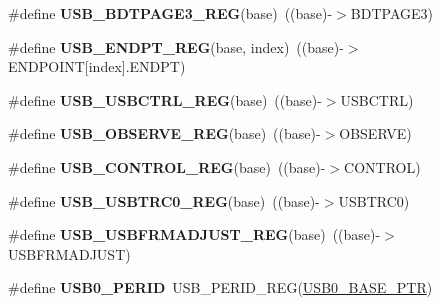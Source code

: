 \begin{DoxyCompactItemize}
\#define {\bfseries U\+S\+B\+\_\+\+B\+D\+T\+P\+A\+G\+E3\+\_\+\+R\+EG}(base)~((base)-\/$>$B\+D\+T\+P\+A\+G\+E3)
\item 
\mbox{\label{group___u_s_b___register___accessor___macros_ga93e8b132ffc209ad3ba99ba2cbf4f990}} 
\#define {\bfseries U\+S\+B\+\_\+\+E\+N\+D\+P\+T\+\_\+\+R\+EG}(base,  index)~((base)-\/$>$E\+N\+D\+P\+O\+I\+NT\mbox{[}index\mbox{]}.E\+N\+D\+PT)
\item 
\mbox{\label{group___u_s_b___register___accessor___macros_ga7e767cbc19006f290fd3acb0bda4b0d7}} 
\#define {\bfseries U\+S\+B\+\_\+\+U\+S\+B\+C\+T\+R\+L\+\_\+\+R\+EG}(base)~((base)-\/$>$U\+S\+B\+C\+T\+RL)
\item 
\mbox{\label{group___u_s_b___register___accessor___macros_gacf3b928d262722e221b19407d6fd1d4b}} 
\#define {\bfseries U\+S\+B\+\_\+\+O\+B\+S\+E\+R\+V\+E\+\_\+\+R\+EG}(base)~((base)-\/$>$O\+B\+S\+E\+R\+VE)
\item 
\mbox{\label{group___u_s_b___register___accessor___macros_gae70ee8839acefd0aeb3e0c5129b59c76}} 
\#define {\bfseries U\+S\+B\+\_\+\+C\+O\+N\+T\+R\+O\+L\+\_\+\+R\+EG}(base)~((base)-\/$>$C\+O\+N\+T\+R\+OL)
\item 
\mbox{\label{group___u_s_b___register___accessor___macros_gaff7c1525f5741bfe869a137149371c89}} 
\#define {\bfseries U\+S\+B\+\_\+\+U\+S\+B\+T\+R\+C0\+\_\+\+R\+EG}(base)~((base)-\/$>$U\+S\+B\+T\+R\+C0)
\item 
\mbox{\label{group___u_s_b___register___accessor___macros_ga0c14a322173f3a4dbb3cc4ea025724ae}} 
\#define {\bfseries U\+S\+B\+\_\+\+U\+S\+B\+F\+R\+M\+A\+D\+J\+U\+S\+T\+\_\+\+R\+EG}(base)~((base)-\/$>$U\+S\+B\+F\+R\+M\+A\+D\+J\+U\+ST)
\item 
\mbox{\label{group___u_s_b___register___accessor___macros_gabee4af6581d4520bd5d8d823d8668889}} 
\#define {\bfseries U\+S\+B0\+\_\+\+P\+E\+R\+ID}~U\+S\+B\+\_\+\+P\+E\+R\+I\+D\+\_\+\+R\+EG(\hyperlink{group___u_s_b___peripheral_ga598ff5eb20a0551af232710b3f27640a}{U\+S\+B0\+\_\+\+B\+A\+S\+E\+\_\+\+P\+TR})

\end{DoxyCompactItemize}
